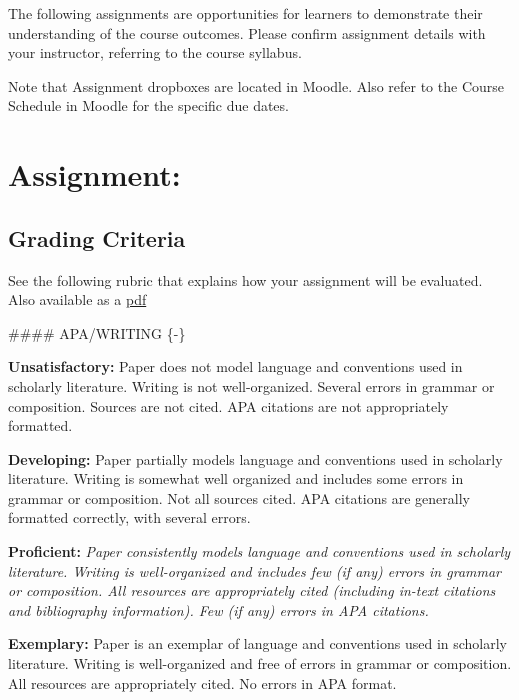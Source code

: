 \documentclass[
]{book}
\begin{document}
The following assignments are opportunities for learners to demonstrate their understanding of the course outcomes. Please confirm assignment details with your instructor, referring to the course syllabus.

Note that Assignment dropboxes are located in Moodle. Also refer to the Course Schedule in Moodle for the specific due dates.

\hypertarget{assignment}{%
\section*{Assignment:}\label{assignment}}

\begin{assessment}

\end{assessment}

\hypertarget{grading-criteria}{%
\subsection*{Grading Criteria}\label{grading-criteria}}

See the following rubric that explains how your assignment will be evaluated. Also available as a \href{assets/assessment/Identity-as-a-Teacher-RUBRIC.pdf}{pdf}

\#\#\#\# APA/WRITING \{-\}

\textbf{Unsatisfactory:} Paper does not model language and conventions used in scholarly literature. Writing is not well-organized. Several errors in grammar or composition. Sources are not cited. APA citations are not appropriately formatted.

\textbf{Developing:} Paper partially models language and conventions used in scholarly literature. Writing is somewhat well organized and includes some errors in grammar or composition. Not all sources cited. APA citations are generally formatted correctly, with several errors.

\textbf{Proficient:} \emph{Paper consistently models language and conventions used in scholarly literature. Writing is well-organized and includes few (if any) errors in grammar or composition. All resources are appropriately cited (including in-text citations and bibliography information). Few (if any) errors in APA citations.}

\textbf{Exemplary:} Paper is an exemplar of language and conventions used in scholarly literature. Writing is well-organized and free of errors in grammar or composition. All resources are appropriately cited. No errors in APA format.
\end{document}
